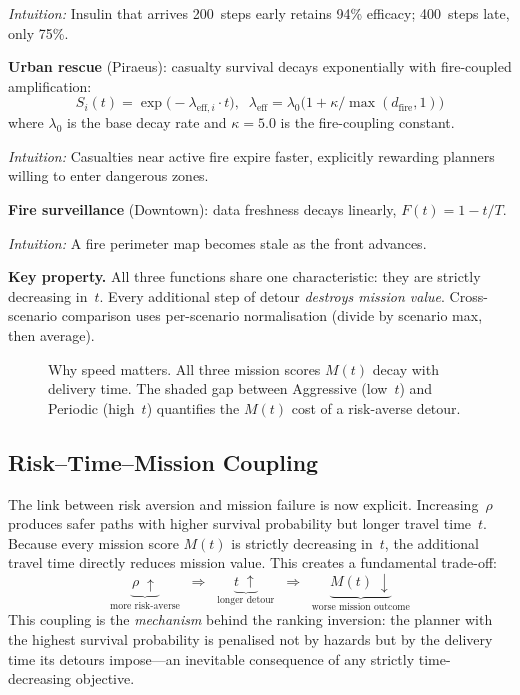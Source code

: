 \documentclass[conference]{IEEEtran}
\begin{document}
\emph{Intuition:} Insulin that arrives 200~steps early retains 94\%
efficacy; 400~steps late, only 75\%.

\textbf{Urban rescue} (Piraeus): casualty survival decays exponentially
with fire-coupled amplification:
\begin{equation}\label{eq:survival}
  S_i(t) = \exp\bigl(-\lambda_{\text{eff},i} \cdot t\bigr), \;\;
  \lambda_{\text{eff}} = \lambda_0
  \bigl(1 + \kappa / \max(d_{\text{fire}}, 1)\bigr)
\end{equation}
where $\lambda_0$ is the base decay rate and $\kappa{=}5.0$ is the
fire-coupling constant.

\emph{Intuition:} Casualties near active fire expire faster, explicitly
rewarding planners willing to enter dangerous zones.

\textbf{Fire surveillance} (Downtown): data freshness decays linearly,
$F(t) = 1 - t/T$.

\emph{Intuition:} A fire perimeter map becomes stale as the front advances.

\textbf{Key property.} All three functions share one characteristic: they
are strictly decreasing in~$t$. Every additional step of detour
\emph{destroys mission value}. Cross-scenario comparison uses
per-scenario normalisation (divide by scenario max, then average).

\begin{figure}[t]
  \centering
  \caption{Why speed matters. All three mission scores $M(t)$ decay with
    delivery time. The shaded gap between Aggressive (low~$t$) and Periodic
    (high~$t$) quantifies the $M(t)$ cost of a risk-averse detour.}
  \label{fig:missiondecay}
\end{figure}

\subsection{Risk--Time--Mission Coupling}\label{sec:coupling}

The link between risk aversion and mission failure is now explicit.
Increasing~$\rho$ produces safer paths with higher survival probability but
longer travel time~$t$. Because every mission score $M(t)$ is strictly
decreasing in~$t$, the additional travel time directly reduces mission
value. This creates a fundamental trade-off:
\[
  \underbrace{\rho \;\uparrow}_{\text{more risk-averse}}
  \;\;\Longrightarrow\;\;
  \underbrace{t \;\uparrow}_{\text{longer detour}}
  \;\;\Longrightarrow\;\;
  \underbrace{M(t) \;\downarrow}_{\text{worse mission outcome}}
\]
This coupling is the \emph{mechanism} behind the ranking inversion: the
planner with the highest survival probability is penalised not by
hazards but by the delivery time its detours impose---an inevitable
consequence of any strictly time-decreasing objective.
\end{document}

